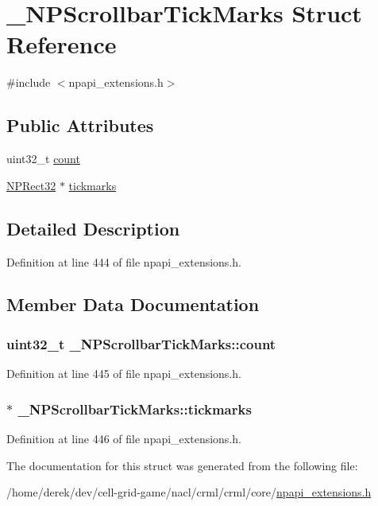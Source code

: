 \hypertarget{struct___n_p_scrollbar_tick_marks}{
\section{\_\-NPScrollbarTickMarks Struct Reference}
\label{struct___n_p_scrollbar_tick_marks}
}


{\ttfamily \#include $<$npapi\_\-extensions.h$>$}

\subsection*{Public Attributes}
\begin{DoxyCompactItemize}
\item 
uint32\_\-t \hyperlink{struct___n_p_scrollbar_tick_marks_ab87d2b3199425315c7d1dc65ce512be3}{count}
\item 
\hyperlink{struct___n_p_rect32}{NPRect32} $\ast$ \hyperlink{struct___n_p_scrollbar_tick_marks_ad9cac69ef29769fccc05791ab75a40b1}{tickmarks}
\end{DoxyCompactItemize}


\subsection{Detailed Description}


Definition at line 444 of file npapi\_\-extensions.h.



\subsection{Member Data Documentation}
\hypertarget{struct___n_p_scrollbar_tick_marks_ab87d2b3199425315c7d1dc65ce512be3}{
\subsubsection[{count}]{\setlength{\rightskip}{0pt plus 5cm}uint32\_\-t {\bf \_\-NPScrollbarTickMarks::count}}}
\label{struct___n_p_scrollbar_tick_marks_ab87d2b3199425315c7d1dc65ce512be3}


Definition at line 445 of file npapi\_\-extensions.h.

\hypertarget{struct___n_p_scrollbar_tick_marks_ad9cac69ef29769fccc05791ab75a40b1}{
\subsubsection[{tickmarks}]{$\ast$ {\bf \_\-NPScrollbarTickMarks::tickmarks}}}
\label{struct___n_p_scrollbar_tick_marks_ad9cac69ef29769fccc05791ab75a40b1}


Definition at line 446 of file npapi\_\-extensions.h.



The documentation for this struct was generated from the following file:\begin{DoxyCompactItemize}
\item 
/home/derek/dev/cell-\/grid-\/game/nacl/crml/crml/core/\hyperlink{npapi__extensions_8h}{npapi\_\-extensions.h}\end{DoxyCompactItemize}
